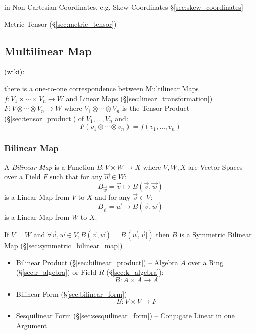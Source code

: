 in Non-Cartesian Coordinates, e.g. Skew Coordinates \S\ref{sec:skew_coordinates}

Metric Tensor (\S\ref{sec:metric_tensor})



\subsection{Multilinear Map}\label{sec:multilinear_map}

(wiki):

there is a one-to-one correspondence between Multilinear Maps
$f : V_1 \times \cdots \times V_n \rightarrow W$
and Linear Maps (\S\ref{sec:linear_transformation})
$F : V \otimes \cdots \otimes V_n \rightarrow W$
where $V_1 \otimes \cdots \otimes V_n$ is the Tensor Product
(\S\ref{sec:tensor_product}) of $V_1, \ldots, V_n$ and:
\[
  F(v_1 \otimes \cdots \otimes v_n) = f(v_1, \ldots, v_n)
\]



\subsubsection{Bilinear Map}\label{sec:bilinear_map}

A \emph{Bilinear Map} is a Function $B : V \times W \rightarrow X$ where
$V, W, X$ are Vector Spaces over a Field $F$ such that for any $\vec{w} \in W$:
\[
  B_{\vec{w}} = \vec{v} \mapsto B(\vec{v}, \vec{w})
\]
is a Linear Map from $V$ to $X$ and for any $\vec{v} \in V$:
\[
  B_{\vec{v}} = \vec{w} \mapsto B(\vec{v}, \vec{w})
\]
is a Linear Map from $W$ to $X$.

If $V = W$ and
$\forall\vec{v},\vec{w} \in V, B(\vec{v},\vec{w}) = B(\vec{w},\vec{v}])$
then $B$ is a Symmetric Bilinear Map (\S\ref{sec:symmetric_bilinear_map})

\begin{itemize}
\item Bilinear Product (\S\ref{sec:bilinear_product}) -- Algebra $A$ over a Ring
  (\S\ref{sec:r_algebra}) or Field $R$ (\S\ref{sec:k_algebra}):
  \[
    B : A \times A \rightarrow A
  \]
\item Bilinear Form (\S\ref{sec:bilinear_form})
  \[
    B : V \times V \rightarrow F
  \]
\item Sesquilinear Form (\S\ref{sec:sesquilinear_form}) -- Conjugate Linear in
  one Argument
\end{itemize}



